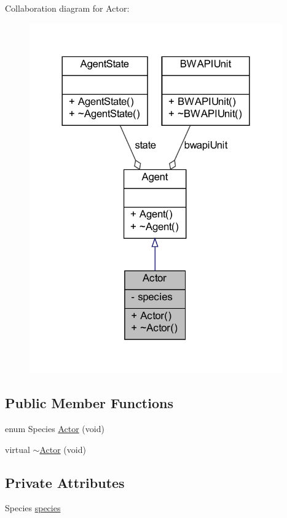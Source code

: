 Collaboration diagram for Actor\-:
\nopagebreak
\begin{figure}[H]
\begin{center}
\leavevmode
\includegraphics[width=308pt]{classActor__coll__graph}
\end{center}
\end{figure}
\subsection*{Public Member Functions}
\begin{DoxyCompactItemize}
\item 
enum Species \hyperlink{classActor_affdd52796b2b452a1ebb73f429bccef7}{Actor} (void)
\item 
virtual \hyperlink{classActor_ad4539f1f14ac449209207a7f71a9e5d8}{$\sim$\-Actor} (void)
\end{DoxyCompactItemize}
\subsection*{Private Attributes}
\begin{DoxyCompactItemize}
\item 
Species \hyperlink{classActor_a87895e4795f9dfb7a07d8d4124fc1a8d}{species}
\end{DoxyCompactItemize}



